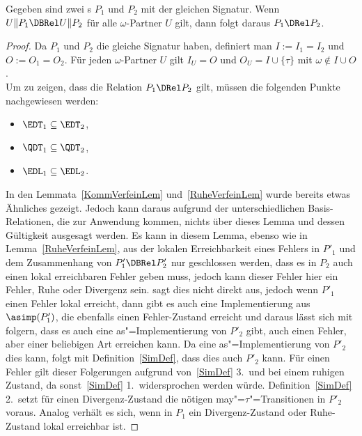 \begin{Lem}
  \label{DivVerfeinLem}
  Gegeben sind zwei \MEIO{}s $P_1$ und $P_2$ mit der gleichen Signatur. Wenn
  $U\|P_1\DBRel U\|P_2$ für alle $\omega$-Partner $U$ gilt, dann folgt daraus
  $P_1\DRel P_2$.
\end{Lem}
\begin{proof}
  Da $P_1$ und $P_2$ die gleiche Signatur haben, definiert man $I:=I_1=I_2$ und
  $O:=O_1=O_2$. Für jeden $\omega$-Partner $U$ gilt $I_U=O$ und
  $O_U=I\cup\{\tau\}$ mit $\omega\notin I\cup O$.\\
  Um zu zeigen, dass die Relation $P_1\DRel P_2$ gilt, müssen die folgenden
  Punkte nachgewiesen werden:
  \begin{itemize}
    \item $\EDT _1\subseteq \EDT _2$,
    \item $\QDT _1\subseteq \QDT _2$,
    \item $\EDL _1\subseteq \EDL _2$.
  \end{itemize}
  In den Lemmata~\ref{KommVerfeinLem} und~\ref{RuheVerfeinLem} wurde bereits
  etwas Ähnliches gezeigt. Jedoch kann daraus aufgrund der unterschiedlichen
  Basis-Relationen, die zur Anwendung kommen, nichts über dieses Lemma und
  dessen Gültigkeit ausgesagt werden. Es kann in diesem Lemma, ebenso wie in
  Lemma~\ref{RuheVerfeinLem}, aus der lokalen Erreichbarkeit eines
  Fehlers in $P'_1$ und dem Zusammenhang von $P'_1\DBRel P'_2$
  nur geschlossen werden, dass es in $P_2$ auch einen lokal erreichbaren
  Fehler geben muss, jedoch kann dieser \glqq Fehler\grqq{} hier ein Fehler,
  Ruhe oder Divergenz sein. \DBRel{} sagt dies nicht direkt aus, jedoch wenn
  $P'_1$ einen Fehler lokal erreicht, dann gibt es auch eine
  Implementierung aus $\asimp (P'_1)$, die ebenfalls einen Fehler-Zustand
  erreicht und daraus lässt sich mit \DBRel{} folgern, dass es auch eine
  as"=Implementierung von $P'_2$ gibt, auch einen \glqq Fehler\grqq{}, aber
  einer beliebigen Art erreichen kann. Da eine as"=Implementierung von $P'_2$
  dies kann, folgt mit Definition~\ref{SimDef}, dass dies auch $P'_2$ kann. Für
  einen Fehler gilt dieser Folgerungen aufgrund von~\ref{SimDef} 3.\ und
  bei einem ruhigen Zustand, da sonst~\ref{SimDef} 1.\ widersprochen werden
  würde. Definition~\ref{SimDef} 2.\ setzt für einen Divergenz-Zustand die
  nötigen may"=$\tau$"=Transitionen in $P'_2$ voraus. Analog verhält es sich,
  wenn in $P_1$ ein Divergenz-Zustand oder Ruhe-Zustand lokal erreichbar ist.


\end{proof}
